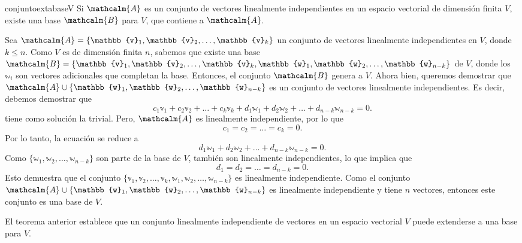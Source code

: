 \begin{theorem}{}{conjuntoextabaseV}
    Si $\mathcalm{A}$ es un conjunto de vectores linealmente independientes en un espacio vectorial de dimensión finita $V$, existe una base $\mathcalm{B}$ para $V$, que contiene a $\mathcalm{A}$.

    \tcblower
    \demostracion Sea $\mathcalm{A} = \{ \mathbb{v}_1, \mathbb{v}_2, \dots, \mathbb{v}_k \}$ un conjunto de vectores linealmente independientes en $V$, donde $k \leq n$. Como $V$ es de dimensión finita $n$, sabemos que existe una base $\mathcalm{B} = \{ \mathbb{v}_1, \mathbb{v}_2, \dots, \mathbb{v}_k, \mathbb{w}_1, \mathbb{w}_2, \dots, \mathbb{w}_{n-k} \}$ de $V$, donde los $\mathbb{w}_i$ son vectores adicionales que completan la base. Entonces, el conjunto $\mathcalm{B}$ genera a $V$. Ahora bien, queremos demostrar que $\mathcalm{A} \cup \{\mathbb{w}_1, \mathbb{w}_2, \dots, \mathbb{w}_{n-k}\}$ es un conjunto de vectores linealmente independientes. Es decir, debemos demostrar que
    $$c_1 \mathbb{v}_1 + c_2 \mathbb{v}_2 + \dots + c_k \mathbb{v}_k + d_1 \mathbb{w}_1 + d_2 \mathbb{w}_2 + \dots + d_{n-k} \mathbb{w}_{n-k} = 0.$$
    tiene como solución la trivial. Pero, $\mathcalm{A}$ es linealmente independiente, por lo que
    $$c_1 = c_2 = \dots = c_k = 0.$$
    \newpage
    Por lo tanto, la ecuación se reduce a
    $$d_1 \mathbb{w}_1 + d_2 \mathbb{w}_2 + \dots + d_{n-k} \mathbb{w}_{n-k} = 0.$$
    Como $\{ \mathbb{w}_1, \mathbb{w}_2, \dots, \mathbb{w}_{n-k} \}$ son parte de la base de $V$, también son linealmente independientes, lo que implica que
    $$d_1 = d_2 = \dots = d_{n-k} = 0.$$
	Esto demuestra que el conjunto $\{ \mathbb{v}_1, \mathbb{v}_2, \dots, \mathbb{v}_k, \mathbb{w}_1, \mathbb{w}_2, \dots, \mathbb{w}_{n-k} \}$ es linealmente independiente. Como el conjunto $\mathcalm{A} \cup \{ \mathbb{w}_1, \mathbb{w}_2, \dots, \mathbb{w}_{n-k} \}$ es linealmente independiente y tiene $n$ vectores, entonces este conjunto es una base de $V$.
\end{theorem}

El teorema anterior establece que un conjunto linealmente independiente de vectores en un espacio vectorial $V$ puede extenderse a una base para $V$.

